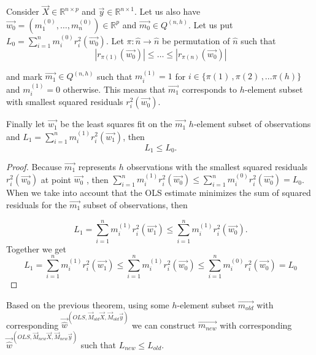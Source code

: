 
\begin{theorem}
Consider 
$\vec{X} \in \mathbb{R}^{n \times p}$ and 
$\vec{y} \in \mathbb{R}^{n \times 1}$.  
Let us also have $\vec{w_0} = (m^{(0)}_1, \ldots, m^{(0)}_n)\in\mathbb{R}^p$ and $\vec{m_0} \in Q^{(n,h)}$. 
Let us put $L_0 = \sum\limits_{i=1}^n m^{(0)}_i r_{i}^2(\vec{w_0})$.
Let $\pi: \hat{n} \rightarrow \hat{n}$ be permutation of $\hat{n}$ such that 
\begin{equation}
    |r_{\pi(1)}(\vec{w_0})| \leq \ldots \leq |r_{\pi(n)}(\vec{w_0})|    
\end{equation}

and mark   $\vec{m_1} \in Q^{(n,h)}$  such that $m^{(1)}_i = 1$ for $i \in \{{\pi(1)\,, \pi(2)\,,... \pi(h)\}}$ and  $m^{(1)}_i = 0$  otherwise. 
This means that  $\vec{m_1}$ corresponds to $h$-element subset with smallest squared residuals $r_{i}^2(\vec{w_0})$.

Finally let $\vec{w_1}$ be the least squares fit on the $\vec{m_1}$ $h$-element subset of observations and $L_1 = \sum\limits_{i=1}^n m^{(1)}_i r_{i}^2(\vec{w_1})$, then
\begin{equation} 
    L_1  \leq L_0.
\end{equation}
\end{theorem}

\begin{proof}
    Because $\vec{m_1}$ represents $h$ observations with the smallest squared residuals $r_{i}^2(\vec{w_0})$ at point $\vec{w_0}$ , then
$\sum\limits_{i=1}^n m^{(1)}_i r_{i}^2(\vec{w_0})
\leq
\sum\limits_{i=1}^n m^{(0)}_i r_{i}^2(\vec{w_0}) =  L_0
$.
When we take into account that the OLS estimate minimizes the sum of squared residuals for the $\vec{m_1}$ subset of observations, then  

\begin{equation}
    L_1 =  \sum\limits_{i=1}^n m^{(1)}_i r_{i}^2(\vec{w_1})
    \leq 
   \sum\limits_{i=1}^n m^{(1)}_i r_{i}^2(\vec{w_0}).    
\end{equation}
Together we get 
\begin{equation}
L_1 = \sum\limits_{i=1}^n m^{(1)}_i r_{i}^2(\vec{w_1})
\leq
\sum\limits_{i=1}^n m^{(1)}_i r_{i}^2(\vec{w_0})
\leq
\sum\limits_{i=1}^n m^{(0)}_i r_{i}^2(\vec{w_0}) =  L_0
\end{equation}
\end{proof}

Based on the previous theorem, using some $h$-element subset $\vec{m_{old}}$ with corresponding
 $\vec{\hat{w}}^{(OLS,\vec{M}_{old}\vec{X}, \vec{M}_{old}\vec{y})}$ 
 we can construct
  $\vec{m_{new}}$ with corresponding $\vec{\hat{w}}^{(OLS,\vec{M}_{new}\vec{X}, \vec{M}_{new}\vec{y})}$ 
  such that $L_{new} \leq L_{old}$. 

